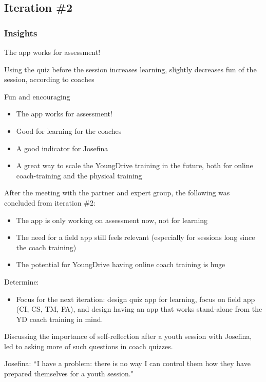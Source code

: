 \subsection{Iteration \#2}

\subsubsection{Insights}

The app works for assessment!

  Using the quiz before the session increases learning, slightly decreases fun of the session, according to coaches

  Fun and encouraging

  \begin{itemize}
    \item The app works for assessment!
    \item Good for learning for the coaches
    \item A good indicator for Josefina
    \item A great way to scale the YoungDrive training in the future, both for online coach-training and the physical training
  \end{itemize}

After the meeting with the partner and expert group, the following was concluded from iteration \#2:

\begin{itemize}
\item The app is only working on assessment now, not for learning
\item The need for a field app still feels relevant (especially for sessions long since the coach training)
\item The potential for YoungDrive having online coach training is huge
\end{itemize}

Determine:
\begin{itemize}
  \item Focus for the next iteration: design quiz app for learning, focus on field app (CI, CS, TM, FA), and design having an app that works stand-alone from the YD coach training in mind.
\end{itemize}

Discussing the importance of self-reflection after a youth session with Josefina, led to asking more of such questions in coach quizzes.

Josefina: “I have a problem: there is no way I can control them how they have prepared themselves for a youth session."

